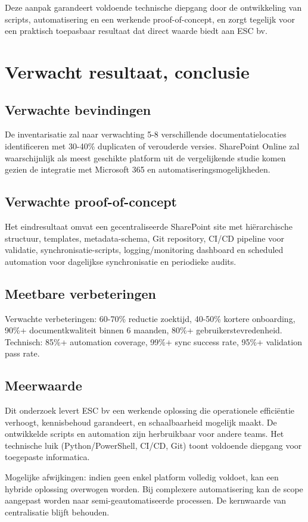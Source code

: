 Deze aanpak garandeert voldoende technische diepgang door de ontwikkeling van scripts, automatisering en een werkende proof-of-concept, en zorgt tegelijk voor een praktisch toepasbaar resultaat dat direct waarde biedt aan ESC bv.

\section{Verwacht resultaat, conclusie}%
\label{sec:verwachte_resultaten}

\subsection{Verwachte bevindingen}

De inventarisatie zal naar verwachting 5-8 verschillende documentatie\-locaties identificeren met 30-40\% duplicaten of verouderde versies. Share\-Point Online zal waarschijnlijk als meest geschikte platform uit de vergelijkende studie komen gezien de integratie met Microsoft 365 en automatiserings\-mogelijkheden.

\subsection{Verwachte proof-of-concept}

Het eindresultaat omvat een gecentraliseerde Share\-Point site met hiërarchische structuur, templates, meta\-data-schema, Git repository, CI/CD pipeline voor validatie, synchronisatie-scripts, logging/\allowbreak monitoring dashboard en scheduled automation voor dagelijkse synchronisatie en periodieke audits.

\subsection{Meetbare verbeteringen}

Verwachte verbeteringen: 60-70\% reductie zoektijd, 40-50\% kortere onboarding, 90\%+ documentkwaliteit binnen 6 maanden, 80\%+ gebruikerstevredenheid. Technisch: 85\%+ automation coverage, 99\%+ sync success rate, 95\%+ validation pass rate.


\subsection{Meerwaarde}

Dit onderzoek levert ESC bv een werkende oplossing die operationele efficiëntie verhoogt, kennisbehoud garandeert, en schaalbaarheid mogelijk maakt. De ontwikkelde scripts en automation zijn herbruikbaar voor andere teams. Het technische luik (Python/PowerShell, CI/CD, Git) toont voldoende diepgang voor toegepaste informatica.

Mogelijke afwijkingen: indien geen enkel platform volledig voldoet, kan een hybride oplossing overwogen worden. Bij complexere automatisering kan de scope aangepast worden naar semi-geautomatiseerde processen. De kernwaarde van centralisatie blijft behouden.

